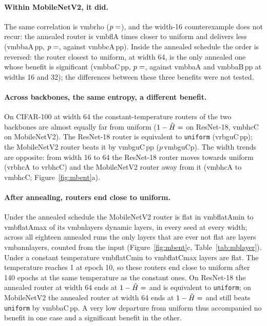 \documentclass[10pt,a4paper]{article}
\newcommand{\V}[1]{\csname v#1\endcsname}
\begin{document}
\paragraph{Within MobileNetV2, it did.} The same correlation is
\V{mbrho} ($p=\V{mbrhop}$), and the width-16 counterexample does not recur:
the annealed router is \V{mbflA} times closer to uniform and delivers less
(\V{mbbaA}\,pp, $p=\V{mbbapA}$, against \V{mbbcA}\,pp). Inside the annealed
schedule the order is reversed: the router closest to uniform, at width
64, is the only annealed one whose benefit is significant (\V{mbbaC}\,pp,
$p=\V{mbbapC}$, against \V{mbbaA} and \V{mbbaB}\,pp at widths 16 and 32);
the differences between these three benefits were not tested.

\paragraph{Across backbones, the same entropy, a different benefit.} On
CIFAR-100 at width 64 the constant-temperature routers of the two
backbones are almost equally far from uniform ($1-\tilde H=\V{rbhcC}$ on
ResNet-18, \V{mbhcC} on MobileNetV2). The ResNet-18 router is equivalent to
\texttt{uniform} (\V{rbguC}\,pp); the MobileNetV2 router beats it by
\V{mbguC}\,pp ($p$\,\V{mbguCp}). The width trends are opposite: from width
16 to 64 the ResNet-18 router moves towards uniform (\V{rbhcA} to
\V{rbhcC}) and the MobileNetV2 router away from it (\V{mbhcA} to
\V{mbhcC}; Figure~\ref{fig:mbent}a).

\paragraph{After annealing, routers end close to uniform.} Under the
annealed schedule the MobileNetV2 router is flat in \V{mbflatAmin} to
\V{mbflatAmax} of its \V{mbnlayers} dynamic layers, in every seed at every
width; across all eighteen annealed runs the only layers that are ever not
flat are layers \V{mbannlayers}, counted from the input
(Figure~\ref{fig:mbent}c, Table~\ref{tab:mblayer}). Under a constant
temperature \V{mbflatCmin} to \V{mbflatCmax} layers are flat. The
temperature reaches 1 at epoch 10, so these routers end close to uniform
after 140 epochs at the same temperature as the constant ones. On
ResNet-18 the annealed router at width 64 ends at $1-\tilde H=\V{haC}$ and
is equivalent to \texttt{uniform}; on MobileNetV2 the annealed router at
width 64 ends at $1-\tilde H=\V{mbhaC}$ and still beats \texttt{uniform} by
\V{mbbaC}\,pp. A very low departure from uniform thus accompanied no
benefit in one case and a significant benefit in the other.
\end{document}
